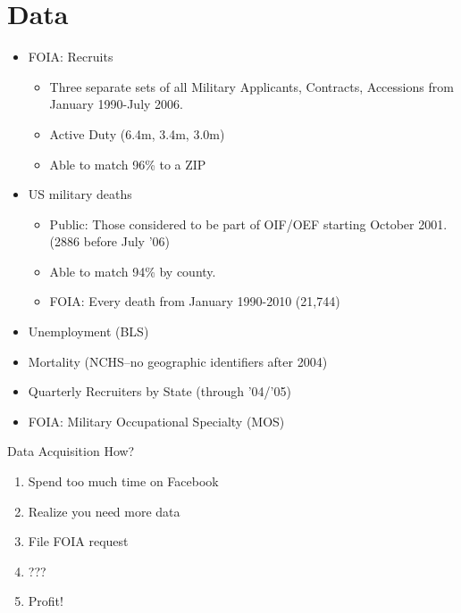 \documentclass{beamer}
\begin{document}
\section{Data}
\begin{frame}{\insertsectionhead}
\begin{itemize}
\item
FOIA: Recruits
\begin{itemize}
\item
Three separate sets of all Military Applicants, Contracts, Accessions from January 1990-July 2006.
\item
Active Duty (6.4m, 3.4m, 3.0m)
\item
Able to match 96\% to a ZIP
\end{itemize}

\item US military deaths
\begin{itemize}
 \item
 Public: Those considered to be part of OIF/OEF starting October 2001. (2886 before July '06)
 \item Able to match 94\% by county.
\item FOIA: Every death from January 1990-2010 (21,744)
\end{itemize}
\item Unemployment (BLS)
\item Mortality (NCHS--no geographic identifiers after 2004)
\item Quarterly Recruiters by State (through '04/'05)
\item FOIA: Military Occupational Specialty (MOS) 
\end{itemize}
\end{frame}

\begin{frame}{Data Acquisition}
How?
\begin{enumerate}
\item Spend too much time on Facebook
\item Realize you need more data
\item File FOIA request
\item ???
\item Profit!
\end{enumerate}
\end{frame}
\end{document}
